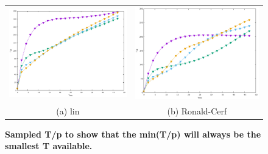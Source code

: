         \begin{figure}[ht]
        \centering
        \begin{tabular}{cc}
          \includegraphics[width=75mm]{./figures/sampled_t_over_p/T_p_lin.pdf} &   \includegraphics[width=75mm]{./figures/sampled_t_over_p/T_p_cerf.pdf} \\
        (a) lin & (b) Ronald-Cerf\\[6pt]
        \end{tabular}
        \caption[Sampled T/p ]{\textbf{Sampled T/p to show that the min(T/p) will always be the smallest T available.}}
        \end{figure}

